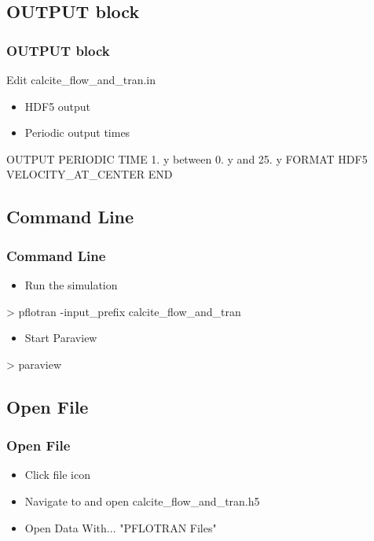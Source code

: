\documentclass{beamer}
\newcommand\magentacomment[1]{{{\color{magenta} #1}}}
\begin{document}

\subsection{OUTPUT block}

\begin{frame}[fragile]\frametitle{OUTPUT block}
Edit calcite\_flow\_and\_tran.in
\begin{itemize}
\item HDF5 output
\item Periodic output times
\end{itemize}
\begin{semiverbatim}
OUTPUT
  \magentacomment{PERIODIC TIME 1. y between 0. y and 25. y}
  FORMAT \magentacomment{HDF5}
  VELOCITY_AT_CENTER
END
\end{semiverbatim}

\end{frame}

\subsection{Command Line}

\begin{frame}[fragile]\frametitle{Command Line}
\begin{itemize}
  \item{Run the simulation}
\end{itemize}
\begin{semiverbatim}
> pflotran -input_prefix calcite_flow_and_tran
\end{semiverbatim}
\begin{itemize}
  \item{Start Paraview}
\end{itemize}
\begin{semiverbatim}
> paraview
\end{semiverbatim}
\end{frame}

\subsection{Open File}

\begin{frame}[fragile]\frametitle{Open File}

\begin{itemize}
  \item Click file icon
  \item Navigate to and open calcite\_flow\_and\_tran.h5 
  \item Open Data With... "PFLOTRAN Files"
\end{itemize}

\end{frame}
\end{document}
